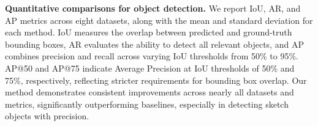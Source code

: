 \begin{table}
\small
\setlength{\tabcolsep}{2pt}
\centering
\caption{\textbf{Quantitative comparisons for object detection. }We report IoU, AR, and AP metrics across eight datasets, along with the mean and standard deviation for each method.  IoU measures the overlap between predicted and ground-truth bounding boxes, AR evaluates the ability to detect all relevant objects, and AP combines precision and recall across varying IoU thresholds from 50\% to 95\%. AP@50 and AP@75 indicate Average Precision at IoU thresholds of 50\% and 75\%, respectively, reflecting stricter requirements for bounding box overlap.  Our method demonstrates consistent improvements across nearly all datasets and metrics, significantly outperforming baselines, especially in detecting sketch objects with precision. } 
\vspace{-3mm} 
\label{tb:bbox_instance}


\end{table}
